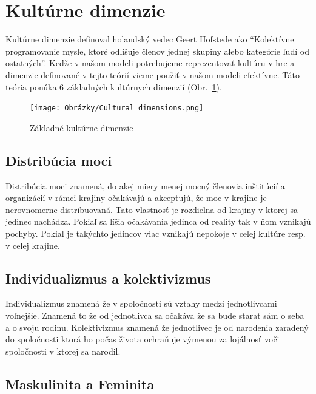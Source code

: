 \documentclass[10pt,oneside,slovak,a4paper]{article}
\begin{document}
\section{Kultúrne dimenzie}\label{kultura} 

Kultúrne dimenzie definoval holandský vedec Geert Hofstede ako \cite{hofstede2010cultures}
``Kolektívne programovanie mysle, ktoré odlišuje členov jednej skupiny alebo kategórie ľudí
od ostatných''. Keďže v našom modeli potrebujeme reprezentovať kultúru v hre a dimenzie definované
v tejto teórií vieme použiť v našom modeli efektívne. Táto teória \cite{hall1966the} ponúka 6
základných kultúrnych dimenzií (Obr.~\ref{fig:culture}).

\begin{figure}[H]
	\centering
	\texttt{[image: Obrázky/Cultural\_dimensions.png]}
	\caption{Základné kultúrne dimenzie~\cite{hofstede2010cultures}}
	\label{fig:culture}
\end{figure}

\subsection{Distribúcia moci}\label{kultura:moc}

Distribúcia moci znamená, do akej miery menej mocný členovia inštitúcií a organizácií v
rámci krajiny očakávajú a akceptujú, že moc v krajine je nerovnomerne distribuovaná. Tato
vlastnosť je rozdielna od krajiny v ktorej sa jedinec nachádza. Pokiaľ sa líšia očakávania
jedinca od reality tak v ňom vznikajú pochyby. Pokiaľ je takýchto jedincov viac vznikajú
nepokoje v celej kultúre resp. v celej krajine.

\subsection{Individualizmus a kolektivizmus}\label{kultura:etika}

Individualizmus znamená že v spoločnosti sú vzťahy medzi jednotlivcami voľnejšie. Znamená
to že od jednotlivca sa očakáva že sa bude starať sám o seba a o svoju rodinu. Kolektivizmus
znamená že jednotlivec je od narodenia zaradený do spoločnosti ktorá ho počas života ochraňuje
výmenou za lojálnosť voči spoločnosti v ktorej sa narodil.

\subsection{Maskulinita a Feminita}\label{kultura:masfem}
\end{document}
